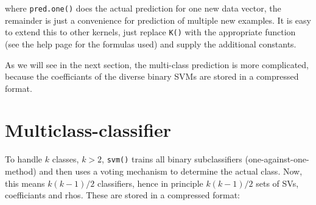 \documentclass[a4paper]{article}
\begin{document}
\noindent where \texttt{pred.one()} does the actual prediction for one
new data vector, the remainder is just a convenience for prediction of
multiple new examples. It is easy to extend this to other kernels,
just replace \texttt{K()} with the appropriate function (see the help
page for the formulas used) and supply the additional constants.

As we will see in the next section, the multi-class prediction is more
complicated, because the coefficiants of the diverse binary SVMs are
stored in a compressed format.

\section{Multiclass-classifier}

To handle $k$ classes, $k>2$, \texttt{svm()} trains all binary subclassifiers
(one-against-one-method) and then uses a voting mechanism to determine
the actual class.
Now, this means $k(k-1)/2$ classifiers, hence in principle $k(k-1)/2$
sets of SVs, coefficiants and rhos. These are stored in a compressed format:
\end{document}
